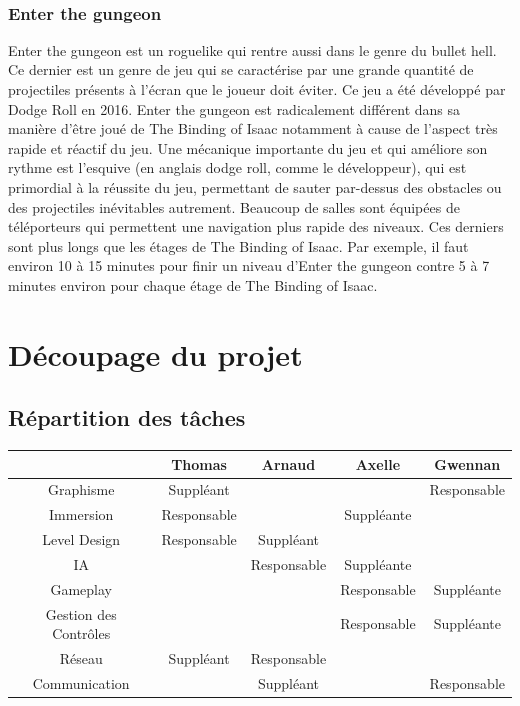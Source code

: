 \documentclass[12pt,a4paper]{article}
\begin{document}
\\
\newpage
\vspace*{.2mm}
\normalsize{\subsubsection{Enter the gungeon}}
Enter the gungeon est un roguelike qui rentre aussi dans le genre du bullet hell. Ce dernier est un genre de jeu qui se caractérise par une grande quantité de projectiles présents à l’écran que le joueur doit éviter. Ce jeu a été développé par Dodge Roll en 2016. Enter the gungeon est radicalement différent dans sa manière d’être joué de The Binding of Isaac notamment à cause de l’aspect très rapide et réactif du jeu. Une mécanique importante du jeu et qui améliore son rythme est l’esquive (en anglais dodge roll, comme le développeur), qui est primordial à la réussite du jeu, permettant de sauter par-dessus des obstacles ou des projectiles inévitables autrement. Beaucoup de salles sont équipées de téléporteurs qui permettent une navigation plus rapide des niveaux. Ces derniers sont plus longs que les étages de The Binding of Isaac. Par exemple, il faut environ 10 à 15 minutes pour finir un niveau d'Enter the gungeon contre 5 à 7 minutes environ  pour chaque étage de The Binding of Isaac. 
\\
\vspace*{1mm}
\section{Découpage du projet}
\subsection{\textbf {Répartition des tâches}}
\vspace{1cm}
\begin{tabular}{|c|c|c|c|c|}
\hline
                      & Thomas      & Arnaud      & Axelle      & Gwennan     \\ \hline
Graphisme             & Suppléant   &             &             & Responsable \\ \hline
Immersion             & Responsable &             & Suppléante  &             \\ \hline
Level Design          & Responsable & Suppléant   &             &             \\ \hline
IA                    &             & Responsable & Suppléante  &             \\ \hline
Gameplay              &             &             & Responsable & Suppléante  \\ \hline
Gestion des Contrôles &             &             & Responsable & Suppléante  \\ \hline
Réseau                & Suppléant   & Responsable &             &             \\ \hline
Communication         &             & Suppléant   &             & Responsable \\ \hline
\end{tabular}
\\
\newpage
\vspace*{1mm}
\end{document}
